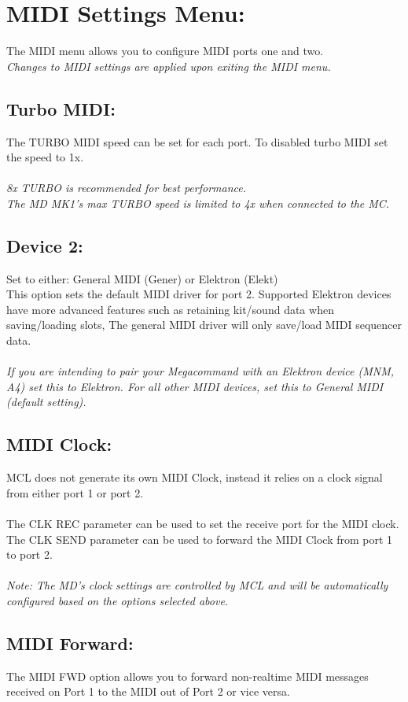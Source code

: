 \chapter{MIDI Settings Menu:}
The MIDI menu allows you to configure MIDI ports one and two.
\\
\textit{Changes to MIDI settings are applied upon exiting the MIDI menu.}
\section{Turbo MIDI:}
The TURBO MIDI speed can be set for each port. To disabled turbo MIDI set the speed to 1x.\\\\
\textit{8x TURBO is recommended for best performance.\\
The MD MK1's max TURBO speed is limited to 4x when connected to the MC.
}
\section{Device 2: }
Set to either: General MIDI (Gener) or Elektron (Elekt)\\

This option sets the default MIDI driver for port 2. Supported Elektron devices have
more advanced features such as retaining kit/sound data when saving/loading slots,
The general MIDI driver will only save/load MIDI sequencer data.\\
\\
\textit{If you are intending to pair your Megacommand with an Elektron device
(MNM, A4) set this to Elektron. For all other MIDI devices, set this to General MIDI (default setting).}
\section{MIDI Clock:}
MCL does not generate its own MIDI Clock, instead it relies on a clock signal from either port 1 or port 2.\\\\
The CLK REC parameter can be used to set the receive port for the MIDI clock.\\
The CLK SEND parameter can be used to forward the MIDI Clock from port 1 to port 2.\\\\
\textit{Note: The MD's clock settings are controlled by MCL and will be automatically configured based on the options selected above.}
\section{MIDI Forward:}
The MIDI FWD option allows you to forward non-realtime MIDI messages received on Port 1 to the MIDI out of Port 2 or vice versa.
